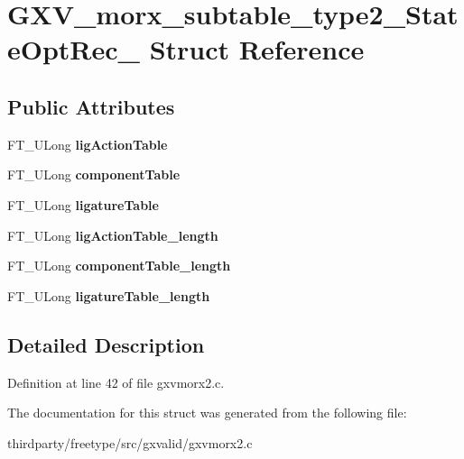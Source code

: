 \hypertarget{struct_g_x_v__morx__subtable__type2___state_opt_rec__}{}\section{G\+X\+V\+\_\+morx\+\_\+subtable\+\_\+type2\+\_\+\+State\+Opt\+Rec\+\_\+ Struct Reference}
\label{struct_g_x_v__morx__subtable__type2___state_opt_rec__}
\subsection*{Public Attributes}
\begin{DoxyCompactItemize}
\item 
\mbox{\label{struct_g_x_v__morx__subtable__type2___state_opt_rec___a91d6cad59d75b6820f79b4958b045437}} 
F\+T\+\_\+\+U\+Long {\bfseries lig\+Action\+Table}
\item 
\mbox{\label{struct_g_x_v__morx__subtable__type2___state_opt_rec___a02e6d9883675f63f1c337fff27edb77f}} 
F\+T\+\_\+\+U\+Long {\bfseries component\+Table}
\item 
\mbox{\label{struct_g_x_v__morx__subtable__type2___state_opt_rec___ad77c00a028fa9d2063c077d6a0d13ac5}} 
F\+T\+\_\+\+U\+Long {\bfseries ligature\+Table}
\item 
\mbox{\label{struct_g_x_v__morx__subtable__type2___state_opt_rec___a5378e0d2c388b1e5d92cfd29233fc709}} 
F\+T\+\_\+\+U\+Long {\bfseries lig\+Action\+Table\+\_\+length}
\item 
\mbox{\label{struct_g_x_v__morx__subtable__type2___state_opt_rec___a7d607cf0288bf0e1328f0452955083e3}} 
F\+T\+\_\+\+U\+Long {\bfseries component\+Table\+\_\+length}
\item 
\mbox{\label{struct_g_x_v__morx__subtable__type2___state_opt_rec___a516eaf9b6fc2798884d244928338b29c}} 
F\+T\+\_\+\+U\+Long {\bfseries ligature\+Table\+\_\+length}
\end{DoxyCompactItemize}


\subsection{Detailed Description}


Definition at line 42 of file gxvmorx2.\+c.



The documentation for this struct was generated from the following file\+:\begin{DoxyCompactItemize}
\item 
thirdparty/freetype/src/gxvalid/gxvmorx2.\+c\end{DoxyCompactItemize}
